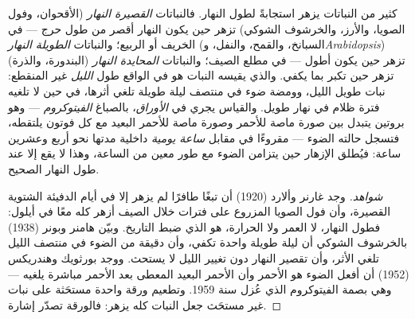 \begin{proposition}\label{prop:b2:plant-flowering:photoperiod}
كثير من النباتات يزهر استجابةً لطول النهار. فالنباتات
\emph{القصيرة النهار} (الأقحوان، وفول الصويا، والأرز، والخرشوف الشوكي) تزهر حين
يكون النهار أقصر من طول حرج --- في الخريف أو الربيع؛
والنباتات \emph{الطويلة النهار} (السبانخ، والقمح، والنفل، و\emph{Arabidopsis})
تزهر حين يكون أطول --- في مطلع الصيف؛ والنباتات \emph{المحايدة
النهار} (البندورة، والذرة) تزهر حين تكبر بما يكفي. والذي يقيسه النبات
هو في الواقع طول \emph{الليل} غير المنقطع:  نبات طويل الليل، وومضة ضوء في
منتصف ليلة طويلة تلغي أثرها، في حين لا تلغيه فترة
ظلام في نهار طويل. والقياس يجري في
\emph{الأوراق}، بالصباغ \emph{الفيتوكروم} --- وهو بروتين
يتبدل بين صورة ماصة للأحمر وصورة ماصة للأحمر البعيد
مع كل فوتون يلتقطه، فتسجل حالته الضوء
--- مقروءًا في مقابل \emph{ساعة يومية} داخلية مدتها نحو
أربع وعشرين ساعة: فيُطلق الإزهار حين يتزامن الضوء مع
طور معين من الساعة، وهذا لا يقع إلا عند طول النهار
الصحيح.
\end{proposition}
\begin{proof}[شواهد]
وجد غارنر وألارد (1920) أن تبغًا طافرًا لم يزهر إلا
في أيام الدفيئة الشتوية القصيرة، وأن فول الصويا المزروع على
فترات خلال الصيف أزهر كله معًا في أيلول:
فطول النهار، لا العمر ولا الحرارة، هو الذي ضبط التاريخ. وبيّن هامنر وبونر
(1938) بالخرشوف الشوكي أن ليلة طويلة واحدة تكفي، وأن
دقيقة من الضوء في منتصف الليل تلغي الأثر،
وأن تقصير النهار دون تغيير الليل لا
يستحث. ووجد بورثويك وهندريكس (1952) أن أفعل
الضوء هو الأحمر وأن الأحمر البعيد المعطى بعد الأحمر مباشرة
يلغيه --- وهي بصمة الفيتوكروم الذي عُزل
سنة 1959. وتطعيم ورقة واحدة مستحَثة على نبات غير مستحَث جعل
النبات كله يزهر: فالورقة تصدّر إشارة.
\end{proof}

